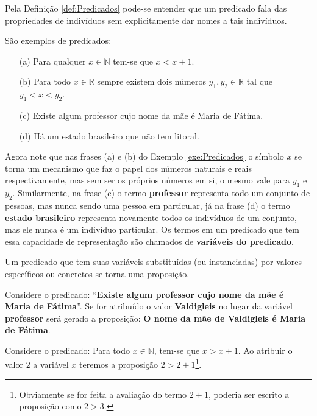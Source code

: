 Pela Definição \ref{def:Predicados} pode-se entender que um predicado fala das propriedades de indivíduos sem explicitamente dar nomes a tais indivíduos.

\begin{exemplo}\label{exe:Predicados}
	São exemplos de predicados:
	\begin{itemize}
		\item[(a)] Para qualquer $x \in \mathbb{N}$ tem-se que $x < x + 1$.
		\item[(b)] Para todo $x \in \mathbb{R}$ sempre existem dois números $y_1, y_2 \in \mathbb{R}$ tal que $y_1 < x < y_2$.
		\item[(c)] Existe algum professor cujo nome da mãe é Maria de Fátima.
		\item[(d)] Há um estado brasileiro que não tem litoral.
	\end{itemize}
\end{exemplo}

Agora note que nas frases (a) e (b) do Exemplo \ref{exe:Predicados} o símbolo $x$ se torna um mecanismo que faz o papel dos números naturais e reais respectivamente, mas sem ser os próprios números em si, o mesmo vale para $y_1$ e $y_2$. Similarmente, na frase (c) o termo \textbf{professor} representa todo um conjunto de pessoas, mas nunca sendo uma pessoa em particular, já na frase (d) o termo \textbf{estado brasileiro} representa novamente todos os indivíduos de um conjunto, mas ele nunca é um indivíduo particular. Os termos em um predicado que tem essa capacidade de representação são chamados de \textbf{variáveis do predicado}.

\begin{atencao}
	Um predicado que tem suas variáveis substituídas (ou instanciadas) por valores específicos ou concretos se torna uma proposição.
\end{atencao}

\begin{exemplo}\label{exe:AtribuirVariavelPredicado1}
	Considere o predicado: ``\textbf{Existe algum professor cujo nome da mãe é Maria de Fátima}''. Se for atribuído o valor \textbf{Valdigleis} no lugar da variável \textbf{professor} será gerado a proposição: \textbf{O nome da mãe de Valdigleis é Maria de Fátima}.
\end{exemplo}

\begin{exemplo}\label{exe:AtribuirVariavelPredicado2}
	Considere o predicado: Para todo $x \in \mathbb{N}$, tem-se que $x > x + 1$. Ao atribuir o valor $2$ a variável $x$ teremos a proposição $2 > 2 + 1$\footnote{Obviamente se for feita a avaliação do termo $2 + 1$, poderia ser escrito a proposição como $2 > 3$.}.
\end{exemplo}

